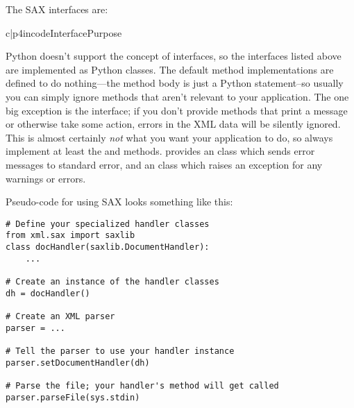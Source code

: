 \documentclass{howto}
\begin{document}
The SAX interfaces are:

\begin{tableii}{c|p{4in}}{code}{Interface}{Purpose}





\end{tableii}

Python doesn't support the concept of interfaces, so the interfaces
listed above are implemented as Python classes.  The default method
implementations are defined to do nothing---the method body is just a
Python  statement--so usually you can simply ignore methods
that aren't relevant to your application.  The one big exception is
the  interface; if you don't provide methods that
print a message or otherwise take some action, errors in the XML data
will be silently ignored.  This is almost certainly \emph{not} what
you want your application to do, so always implement at least the
 and  methods.
 provides an  class which
sends error messages to standard error, and an 
class which raises an exception for any warnings or errors.

Pseudo-code for using SAX looks something like this:
\begin{verbatim}
# Define your specialized handler classes
from xml.sax import saxlib
class docHandler(saxlib.DocumentHandler):
    ...

# Create an instance of the handler classes
dh = docHandler()

# Create an XML parser
parser = ...

# Tell the parser to use your handler instance
parser.setDocumentHandler(dh)

# Parse the file; your handler's method will get called
parser.parseFile(sys.stdin)
\end{verbatim}
\end{document}
